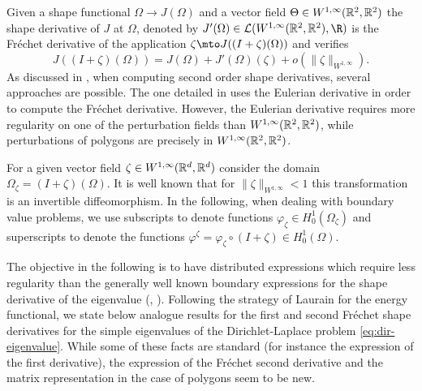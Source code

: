 Given a shape functional $\Omega \to J(\Omega)$ and a vector field $\Theta \in W^{1,\infty}(\Bbb{R}^2,\Bbb{R}^2)$ the shape derivative of $J$ at $\Omega$, denoted by $J'(\Omega)\in \mathcal L(W^{1,\infty}(\Bbb{R}^2,\Bbb{R}^2), \R)$ is the Fréchet derivative of the application $\zeta \mto J((I+\zeta)(\Omega))$ and verifies
\[
J((I+\zeta)(\Omega)) = J(\Omega)+J'(\Omega)(\zeta) + o(\|\zeta\|_{W^{1,\infty}}).
\]
As discussed in \cite[\S 9.1]{laurain2ndDeriv}, when computing second order shape derivatives, several approaches are possible. The one detailed in \cite{laurain2ndDeriv} uses the Eulerian derivative in order to compute the Fréchet derivative. However, the Eulerian derivative requires more regularity on one of the perturbation fields than $ W^{1,\infty}(\Bbb{R}^2,\Bbb{R}^2)$, while perturbations of polygons are precisely in $ W^{1,\infty}(\Bbb{R}^2,\Bbb{R}^2)$.

For a given vector field $\zeta \in W^{1,\infty}(\Bbb{R}^d,\Bbb{R}^d)$ consider the domain $\Omega_\zeta = (I+\zeta)(\Omega)$. It is well known that for $\|\zeta \|_{W^{1,\infty}}<1$ this transformation is an invertible diffeomorphism. In the following, when dealing with boundary value problems, we use subscripts to denote functions $\varphi_\zeta \in H_0^1(\Omega_\zeta)$ and superscripts to denote the functions $\varphi^\zeta = \varphi_\zeta \circ (I+\zeta)\in H_0^1(\Omega)$.

The objective in the following is to have distributed expressions which require less regularity than the generally well known boundary expressions for the shape derivative of the eigenvalue (\cite{HPR04}, \cite{henrot-pierre-english}). Following the strategy of Laurain for the energy functional, we state below analogue results for the first and second Fréchet shape derivatives for the simple eigenvalues of the Dirichlet-Laplace problem \eqref{eq:dir-eigenvalue}. While some of these facts are standard (for instance the expression of the first derivative), the expression of the Fréchet second derivative and the matrix representation in the case of polygons seem to be new.

